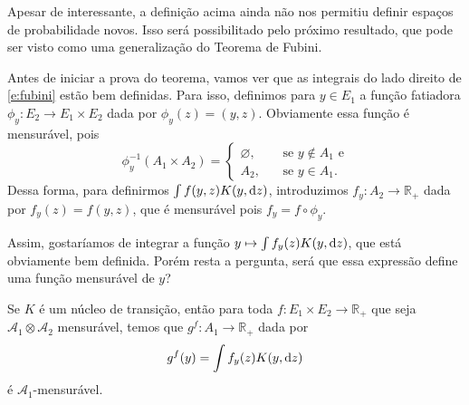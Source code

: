 Apesar de interessante, a definição acima ainda não nos permitiu definir espaços de probabilidade novos.
Isso será possibilitado pelo próximo resultado, que pode ser visto como uma generalização do Teorema de Fubini.



Antes de iniciar a prova do teorema, vamos ver que as integrais do lado direito de \eqref{e:fubini} estão bem definidas.
Para isso, definimos para $y \in E_1$ a função fatiadora $\phi_y: E_2 \to E_1 \times E_2$ dada por $\phi_y(z) = (y, z)$.
Obviamente essa função é mensurável, pois
\begin{equation}
  \phi_y^{-1}(A_1 \times A_2) =
  \begin{cases}
    \varnothing, \quad & \text{ se $y \not \in A_1$ e}\\
    A_2, & \text{ se $y \in A_1$}.
  \end{cases}
\end{equation}
Dessa forma, para definirmos $\int f(y,z) K(y, \mathop{}\!\mathrm{d} z)$, introduzimos $f_y: A_2 \to \mathbb{R}_+$ dada por $f_y(z) = f(y,z)$, que é mensurável pois $f_y = f \circ \phi_y$.

Assim, gostaríamos de integrar a função $y \mapsto \int f_y(z) K(y, \mathop{}\!\mathrm{d} z)$, que está obviamente bem definida.
Porém resta a pergunta, será que essa expressão define uma função mensurável de $y$?

\begin{lemma}
  Se $K$ é um núcleo de transição, então para toda $f: E_1 \times E_2 \to \mathbb{R}_+$ que seja $\mathcal{A}_1 \otimes \mathcal{A}_2$ mensurável, temos que $g^f:A_1 \to \mathbb{R}_+$ dada por
  \begin{equation}
    g^f(y) = \int f_y(z) K(y, \mathop{}\!\mathrm{d} z)
  \end{equation}
  é $\mathcal{A}_1$-mensurável.
\end{lemma}

